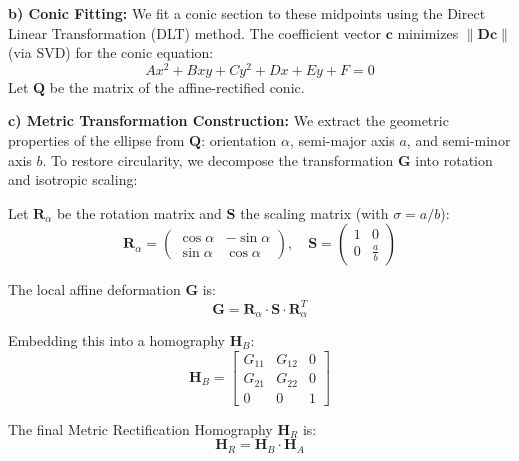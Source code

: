 \documentclass[a4paper,11pt]{article}
\newcommand{\matr}[1]{\bm{#1}}     %
\newcommand{\vect}[1]{\mathbf{#1}}  %
\begin{document}
\begin{enumerate}
    
    \textbf{b) Conic Fitting:}
    We fit a conic section to these midpoints using the Direct Linear Transformation (DLT) method. The coefficient vector $\vect{c}$ minimizes $\|\matr{D}\vect{c}\|$ (via SVD) for the conic equation:
    \begin{equation}
        Ax^2 + Bxy + Cy^2 + Dx + Ey + F = 0
    \end{equation}
    Let $\matr{Q}$ be the matrix of the affine-rectified conic.
    
    \textbf{c) Metric Transformation Construction:}
    We extract the geometric properties of the ellipse from $\matr{Q}$: orientation $\alpha$, semi-major axis $a$, and semi-minor axis $b$. To restore circularity, we decompose the transformation $\matr{G}$ into rotation and isotropic scaling:
    
    Let $\matr{R}_{\alpha}$ be the rotation matrix and $\matr{S}$ the scaling matrix (with $\sigma = a/b$):
    \begin{equation}
        \matr{R}_{\alpha} = \begin{pmatrix} 
        \cos\alpha & -\sin\alpha \\ 
        \sin\alpha & \cos\alpha 
        \end{pmatrix}, \quad
        \matr{S} = \begin{pmatrix} 
        1 & 0 \\ 
        0 & \frac{a}{b} 
        \end{pmatrix}
    \end{equation}
    
    The local affine deformation $\matr{G}$ is:
    \begin{equation}
        \matr{G} = \matr{R}_{\alpha} \cdot \matr{S} \cdot \matr{R}_{\alpha}^T
    \end{equation}
    
    Embedding this into a homography $\matr{H}_B$:
    \begin{equation}
        \matr{H}_B = \begin{bmatrix} 
        G_{11} & G_{12} & 0 \\ 
        G_{21} & G_{22} & 0 \\ 
        0 & 0 & 1 
        \end{bmatrix} 
    \end{equation}
    
    The final Metric Rectification Homography $\matr{H}_R$ is:
    \begin{equation}
        \matr{H}_R = \matr{H}_B \cdot \matr{H}_A
    \end{equation}
\end{enumerate}
\end{document}
